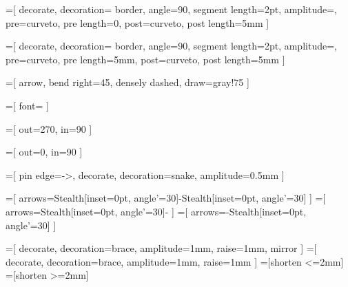 =[
  decorate,
  decoration={
    border, angle=90, segment length=2pt, amplitude=\pgflinewidth,
    pre=curveto, pre length=0, post=curveto, post length=5mm
  }
]

=[
  decorate,
  decoration={
    border, angle=90, segment length=2pt, amplitude=\pgflinewidth,
    pre=curveto, pre length=5mm, post=curveto, post length=5mm
  }
]

=[
  arrow,
  bend right=45,
  densely dashed,
  draw=gray!75
]

=[
  font=\small
]

=[
  out=270,
  in=90
]

=[
  out=0,
  in=90
]

=[
  pin edge={->, decorate, decoration={snake, amplitude=0.5mm}}
]

=[
  arrows={Stealth[inset=0pt, angle'=30]-Stealth[inset=0pt, angle'=30]}
]
=[
  arrows={Stealth[inset=0pt, angle'=30]-}
]
=[
  arrows={-Stealth[inset=0pt, angle'=30]}
]

\newcommand{\bottommeasure}[4][7mm] {
  \begin{scope}[line width=0.1mm]
    \coordinate (x) at ([yshift=-#1] #3);
    \draw (x) [measure] -- node [label={[label distance=-2mm]above:#2}] {} (x -| #4);
    \draw (#3) -- ++(0, -#1) -- +(0, -1.25mm);
    \draw (#4) -- ++(0, -#1) -- +(0, -1.25mm);
  \end{scope}
}

\newcommand{\rightbottommeasure}[4][5mm] {
\begin{scope}[line width=0.1mm]
  \draw (#3) -- ++(0, -#1) -- ++(0, 1.25mm) coordinate(x);
  \draw (x) [direct measure] -- +(-3mm, 0);
  \draw (#4) -- ++(0, -#1) -- ++(0, 1.25mm) coordinate(x);
  \draw (x) [direct measure] -- node [label={[label distance=-1mm]above:#2}] {} +(8mm, 0);
\end{scope}
}

\newcommand{\topmeasure}[4][3mm] {
  \begin{scope}[line width=0.1mm]
    \coordinate (x) at ([yshift=#1] #3);
    \draw (x) [measure] -- node [label={[label distance=-2mm]above:#2}] {} (x -| #4);
    \draw (#3) -- ++(0, #1) -- +(0, 1.25mm);
    \draw (#4) -- ++(0, #1) -- +(0, 1.25mm);
  \end{scope}
}

=[
  decorate, decoration={brace, amplitude=1mm, raise=1mm, mirror}
]
=[
  decorate, decoration={brace, amplitude=1mm, raise=1mm}
]
=[shorten <=2mm]
=[shorten >=2mm]

